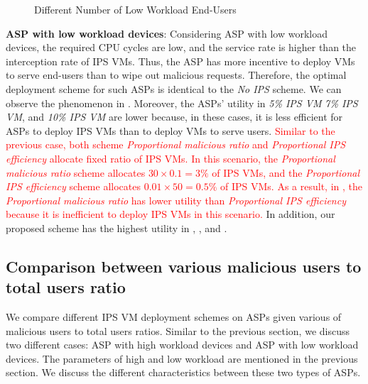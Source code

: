 \documentclass[10pt,journal, compsoc]{IEEEtran}
\begin{document}
\begin{figure}[!]
\captionsetup{justification=centering}
  \hfill
  \hfill
\label{fig:num_cmp_low}
\caption{Different Number of Low Workload End-Users}
\end{figure}

\textbf{ASP with low workload devices}:
Considering ASP with low workload devices, the required CPU cycles are low, and the service rate is higher than the interception rate of IPS VMs. Thus, the ASP has more incentive to deploy VMs to serve end-users than to wipe out malicious requests. Therefore, the optimal deployment scheme for such ASPs is identical to the \textit{No IPS} scheme. We can observe the phenomenon in . Moreover, the ASPs' utility in \textit{5\% IPS VM} \textit{7\% IPS VM}, and \textit{10\% IPS VM} are lower because, in these cases, it is less efficient for ASPs to deploy IPS VMs than to deploy VMs to serve users. \textcolor{red}{Similar to the previous case, both scheme \textit{Proportional malicious ratio} and \textit{Proportional IPS efficiency} allocate fixed ratio of IPS VMs. In this scenario, the \textit{Proportional malicious ratio} scheme allocates $30 \times 0.1 = 3\%$ of IPS VMs, and the \textit{Proportional IPS efficiency} scheme allocates $0.01 \times 50 = 0.5\%$ of IPS VMs. As a result, in , the \textit{Proportional malicious ratio} has lower utility than \textit{Proportional IPS efficiency} because it is inefficient to deploy IPS VMs in this scenario.} In addition, our proposed scheme has the highest utility in , , and .

\subsection{Comparison between various malicious users to total users ratio}\label{subsec:mal}
We compare different IPS VM deployment schemes on ASPs given various of malicious users to total users ratios. Similar to the previous section, we discuss two different cases: ASP with high workload devices and ASP with low workload devices. The parameters of high and low workload are mentioned in the previous section. We discuss the different characteristics between these two types of ASPs. 
\end{document}
